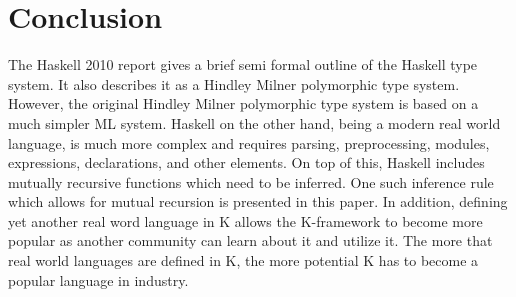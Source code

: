 \chapter{Conclusion}

The Haskell 2010 report gives a brief semi formal outline of the Haskell type system. It also describes it as a Hindley Milner polymorphic type system. However, the original Hindley Milner polymorphic type system is based on a much simpler ML system. Haskell on the other hand, being a modern real world language, is much more complex and requires parsing, preprocessing, modules, expressions, declarations, and other elements. On top of this, Haskell includes mutually recursive functions which need to be inferred. One such inference rule which allows for mutual recursion is presented in this paper. In addition, defining yet another real word language in K allows the K-framework to become more popular as another community can learn about it and utilize it. The more that real world languages are defined in K, the more potential K has to become a popular language in industry.